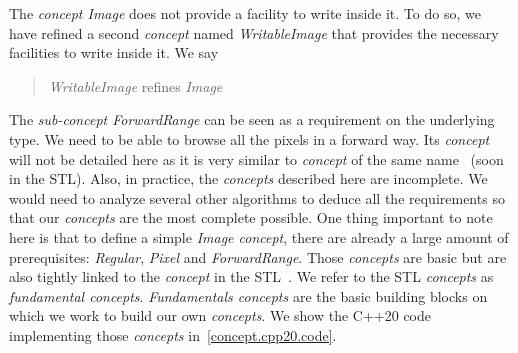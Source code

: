 The \emph{concept Image} does not provide a facility to write inside it. To do so, we have refined a second
\emph{concept} named \emph{WritableImage} that provides the necessary facilities to write inside it. We say
\blockquote{\emph{WritableImage} refines \emph{Image}}.

The \emph{sub-concept ForwardRange} can be seen as a requirement on the underlying type. We need to be able to browse
all the pixels in a forward way. Its \emph{concept} will not be detailed here as it is very similar to \emph{concept} of
the same name~\cite{niebler.2018.mergingranges,niebler.2018.deepranges} (soon in the STL). Also, in practice, the
\emph{concepts} described here are incomplete. We would need to analyze several other algorithms to deduce all the
requirements so that our \emph{concepts} are the most complete possible. One thing important to note here is that to
define a simple \emph{Image concept}, there are already a large amount of prerequisites:
\label{term.regular}\emph{Regular}, \emph{Pixel} and \emph{ForwardRange}. Those \emph{concepts} are basic but are also
tightly linked to the \emph{concept} in the STL~\cite{carter.2018.concepts}. We refer to the STL \emph{concepts} as
\emph{fundamental concepts}. \emph{Fundamentals concepts} are the basic building blocks on which we work to build our
own \emph{concepts}. We show the C++20 code implementing those \emph{concepts} in~\ref{concept.cpp20.code}.


